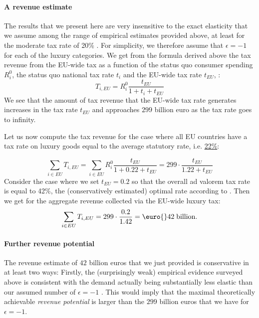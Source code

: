 \documentclass{article}
\begin{document}
\paragraph{A revenue estimate  } 
The results that we present here are very insensitive to the exact elasticity that we assume among the range of empirical estimates provided above, at least for the moderate tax rate of 20\% . For simplicity, we therefore assume that $\epsilon=-1$ for each of the luxury categories. We get from the formula derived above the tax revenue from the EU-wide tax as a function of the status quo consumer spending $R_i^0$, the status quo national tax rate $t_i$  and the EU-wide tax rate $t_{EU}$, :
\[
T_{i,EU}= R_i^0 \frac{t_{EU}}{1+t_i+t_{EU}}
\]
We see that the amount of tax revenue that the EU-wide tax rate generates increases in the tax rate $t_{EU}$ and approaches $299$ billion euro as the tax rate goes to infinity. 

Let us now compute the tax revenue for the case where all EU countries have a tax rate on luxury goods equal to the average statutory rate, i.e.  \hyperlink{https://taxfoundation.org/data/all/eu/value-added-tax-vat-rates-europe/}{22\%}:

\[
\sum_{i\in {EU}} T_{i,EU}= \sum_{i\in {EU}} R_i^0 \frac{t_{EU}}{1+0.22+t_{EU}}=  299 \cdot \frac{t_{EU}}{1.22+t_{EU}}
\]
Consider the case where we set $t_{EU}=0.2$ so that the overall ad valorem tax rate is equal to 42\%, the (conservatively estimated) optimal rate according to \citet{Xie2026}. Then we get for the aggregate revenue collected via the EU-wide luxury tax:
\[
\sum_{i\in {EU}} T_{i,EU}=  299 \cdot \frac{0.2}{1.42}= \text{\euro{}} 42\; \mathrm{billion}.
\]

\paragraph{Further revenue potential}
The revenue estimate of $42$ billion euros that we just provided is conservative in at least two ways: Firstly, the (surprisingly weak) empirical evidence surveyed above is consistent with the demand actually being substantially less elastic than our assumed number of $\epsilon=-1$ . This would imply that the maximal theoretically achievable \textit{revenue potential} is larger than the $299$ billion euros 
 that we have for $\epsilon =-1$. 
\end{document}
